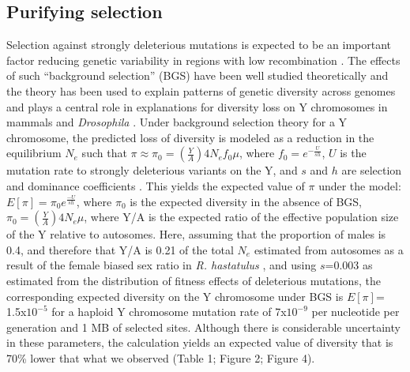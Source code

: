 \documentclass[9pt,twocolumn,twoside,lineno]{gsajnl}
\begin{document}
\subsection*{Purifying selection}
Selection against strongly deleterious mutations is expected to be an important factor reducing genetic variability in regions with low recombination \citep{charlesworth1993effect, charlesworth1996background}. The effects of such “background selection” (BGS) have been well studied theoretically \citep{charlesworth1997effects, nordborg1996effect, kim2000joint} and the theory has been used to explain patterns of genetic diversity across genomes \citep{comeron2014background} and plays a central role in explanations for diversity loss on Y chromosomes in mammals \citep{Wilsonsayres2014} and \textit{Drosophila} \citep{mcallister1999, charlesworth1996CB}. Under background selection theory for a Y chromosome, the predicted loss of diversity is modeled as a reduction in the equilibrium $N_{e}$ such that $\pi \approx \pi_{0}=(\frac{Y}{A})4N_{e}f_{0}\mu$, where $f_{0}=e^{-\frac{U}{sh}}$, $U$ is the mutation rate to strongly deleterious variants on the Y, and $s$ and $h$ are selection and dominance coefficients \citep{hudson1995deleterious}. This yields the expected value of $\pi$ under the model: $E[\pi]=\pi_{0}e^{\frac{-U}{sh}}$, where $\pi_{0}$ is the expected diversity in the absence of BGS, $\pi_{0}=(\frac{Y}{A})4N_{e}\mu$, where Y/A is the expected ratio of the effective population size of the Y relative to autosomes. Here, assuming that the proportion of males is 0.4, and therefore that Y/A is 0.21 of the total $N_{e}$ estimated from autosomes as a result of the female biased sex ratio in \textit{R. hastatulus} \citep{pickup2013influence}, and using $s$=0.003 as estimated from the distribution of fitness effects of deleterious mutations, the corresponding expected diversity on the Y chromosome under BGS is $E[\pi]$= 1.5x$10^{-5}$ for a haploid Y chromosome mutation rate of 7x$10^{-9}$ per nucleotide per generation and 1 MB of selected sites. Although there is considerable uncertainty in these parameters, the calculation yields an expected value of diversity that is 70\% lower that what we observed (Table 1; Figure 2; Figure 4).
\end{document}
